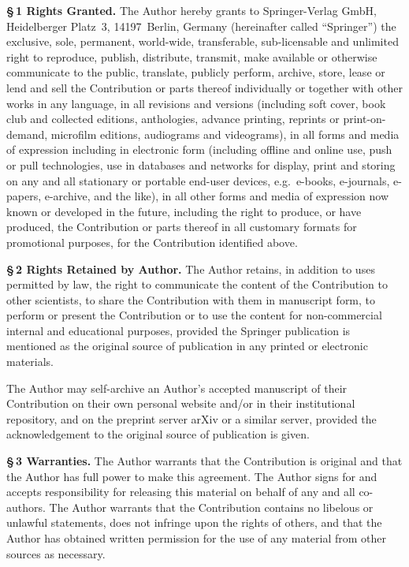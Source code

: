 \documentclass[11pt]{article}
\begin{document}
\vspace{6pt}
\textbf{§\,1 Rights Granted.}
The Author hereby grants to Springer-Verlag GmbH, Heidelberger Platz~3,
14197~Berlin, Germany (hereinafter called ``Springer'') the exclusive,
sole, permanent, world-wide, transferable, sub-licensable and unlimited right
to reproduce, publish, distribute, transmit, make available or otherwise
communicate to the public, translate, publicly perform, archive, store,
lease or lend and sell the Contribution or parts thereof individually or
together with other works in any language, in all revisions and versions
(including soft cover, book club and collected editions, anthologies,
advance printing, reprints or print-on-demand, microfilm editions,
audiograms and videograms), in all forms and media of expression
including in electronic form (including offline and online use, push or
pull technologies, use in databases and networks for display, print and
storing on any and all stationary or portable end-user devices, e.g.\
e-books, e-journals, e-papers, e-archive, and the like), in all other
forms and media of expression now known or developed in the future,
including the right to produce, or have produced, the Contribution or
parts thereof in all customary formats for promotional purposes, for the
Contribution identified above.

\vspace{6pt}
\textbf{§\,2 Rights Retained by Author.}
The Author retains, in addition to uses permitted by law, the right to
communicate the content of the Contribution to other scientists, to share
the Contribution with them in manuscript form, to perform or present the
Contribution or to use the content for non-commercial internal and
educational purposes, provided the Springer publication is mentioned as the
original source of publication in any printed or electronic materials.

The Author may self-archive an Author's accepted manuscript of their
Contribution on their own personal website and/or in their institutional
repository, and on the preprint server arXiv or a similar server,
provided the acknowledgement to the original source of publication is
given.

\vspace{6pt}
\textbf{§\,3 Warranties.}
The Author warrants that the Contribution is original and that the Author
has full power to make this agreement. The Author signs for and accepts
responsibility for releasing this material on behalf of any and all
co-authors. The Author warrants that the Contribution contains no
libelous or unlawful statements, does not infringe upon the rights of
others, and that the Author has obtained written permission for the use
of any material from other sources as necessary.
\end{document}
